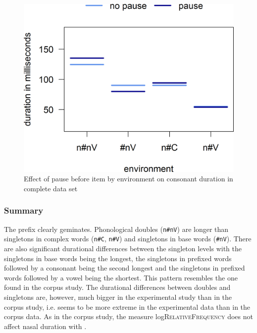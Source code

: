 \begin{figure}
\includegraphics [scale=0.5] {images/Experiment/unModelCompleteInterEnvPause}
\caption{Effect of pause before item by environment on consonant duration in complete data set}
\label{fig:NumNasal Pauseun experiment}
\end{figure}


\subsubsection{Summary}


The prefix  clearly geminates. Phonological doubles (\texttt{n\#nV})  are longer than singletons in complex words (\texttt{n\#C}, \texttt{n\#V}) and singletons in base words (\texttt{\#nV}). There are also significant durational differences between the singleton levels with the singletons in base words being the longest, the singletons in prefixed words followed by a consonant being the second longest and the singletons in prefixed words followed by a vowel being the shortest. This pattern resembles the one found in the corpus study. The durational differences between doubles and singletons are, however, much bigger in the experimental study than in the corpus study, i.e.  seems to be more extreme in the experimental data than in the corpus data. 
As in the corpus study, the  measure log\textsc{RelativeFrequency} does not affect nasal duration with .


